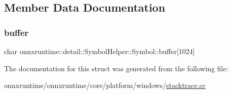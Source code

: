 \subsection{Member Data Documentation}
\mbox{\label{structonnxruntime_1_1detail_1_1SymbolHelper_1_1Symbol_a31dad8fbecab994a90467a591f94e7bd}} 
\subsubsection{\texorpdfstring{buffer}{buffer}}
{\footnotesize\ttfamily char onnxruntime\+::detail\+::\+Symbol\+Helper\+::\+Symbol\+::buffer\mbox{[}1024\mbox{]}}



The documentation for this struct was generated from the following file\+:\begin{DoxyCompactItemize}
\item 
onnxruntime/onnxruntime/core/platform/windows/\mbox{\hyperlink{windows_2stacktrace_8cc}{stacktrace.\+cc}}\end{DoxyCompactItemize}
